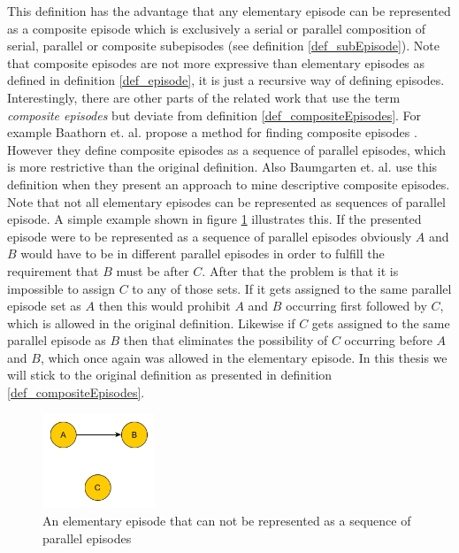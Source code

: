 This definition has the advantage that any elementary episode can be represented as a composite episode which is exclusively a serial or parallel composition of serial, parallel or composite subepisodes (see definition \ref{def_subEpisode}). Note that composite episodes are not more expressive than elementary episodes as defined in definition \ref{def_episode}, it is just a recursive way of defining episodes. \\
Interestingly, there are other parts of the related work that use the term \textit{composite episodes} but deviate from definition \ref{def_compositeEpisodes}. For example Baathorn et. al. propose a method for finding composite episodes \cite{bathoorn2007finding}. However they define composite episodes as a sequence of parallel episodes, which is more restrictive than the original definition. Also Baumgarten et. al. use this definition \cite{baumgarten2003tree} when they present an approach to mine descriptive composite episodes. Note that not all elementary episodes can be represented as sequences of parallel episode. A simple example shown in figure \ref{fig_notSequenceOfSet} illustrates this. If the presented episode were to be represented as a sequence of parallel episodes obviously $A$ and $B$ would have to be in different parallel episodes in order to fulfill the requirement that $B$ must be after $C$. After that the problem is that it is impossible to assign $C$ to any of those sets. If it gets assigned to the same parallel episode set as $A$ then this would prohibit $A$ and $B$ occurring first followed by $C$, which is allowed in the original definition. Likewise if $C$ gets assigned to the same parallel episode as $B$ then that eliminates the possibility of $C$ occurring before $A$ and $B$, which once again was allowed in the elementary episode. In this thesis we will stick to the original definition as presented in definition \ref{def_compositeEpisodes}. \newline

\begin{figure}[h]
	\centering
  	\includegraphics[width=0.3\textwidth]{notSequenceOfSet}
	\caption{An elementary episode that can not be represented as a sequence of parallel episodes}
	\label{fig_notSequenceOfSet}
\end{figure}

